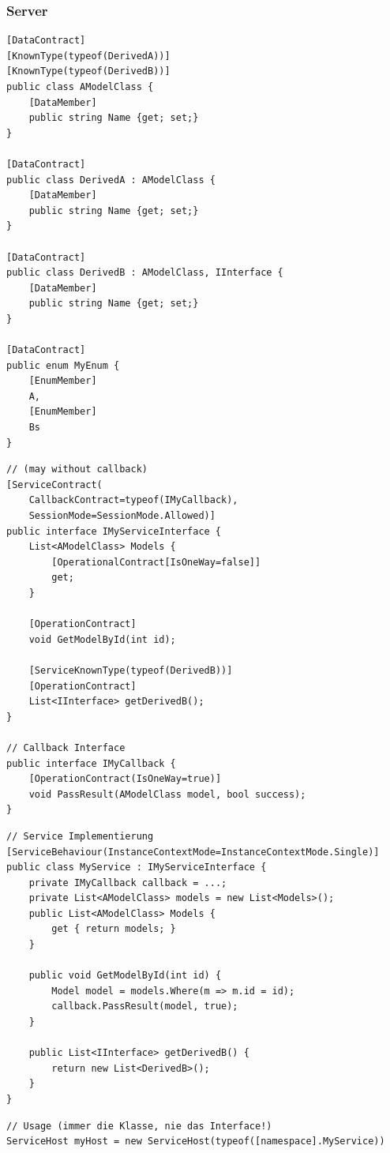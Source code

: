 \documentclass[
a4paper,
oneside,
10pt,
fleqn,
headsepline,
toc=listofnumbered, 
bibliography=totocnumbered]{scrartcl}
\begin{document}
\subsubsection{Server}
\begin{lstlisting}[caption=Data Transfer Objects (DTO)]
[DataContract]
[KnownType(typeof(DerivedA))]
[KnownType(typeof(DerivedB))]
public class AModelClass {
	[DataMember]
	public string Name {get; set;}	
}

[DataContract]
public class DerivedA : AModelClass {
	[DataMember]
	public string Name {get; set;}
}

[DataContract]
public class DerivedB : AModelClass, IInterface {
	[DataMember]
	public string Name {get; set;}
}

[DataContract]
public enum MyEnum {
	[EnumMember]
	A,
	[EnumMember]
	Bs
}
\end{lstlisting}
\begin{lstlisting}[caption=Service Interface]
// (may without callback)
[ServiceContract(
	CallbackContract=typeof(IMyCallback),
	SessionMode=SessionMode.Allowed)]
public interface IMyServiceInterface {
	List<AModelClass> Models {
		[OperationalContract[IsOneWay=false]]
		get;
	}
	
	[OperationContract]
	void GetModelById(int id);
	
	[ServiceKnownType(typeof(DerivedB))]
	[OperationContract]
	List<IInterface> getDerivedB();
}

// Callback Interface
public interface IMyCallback {
	[OperationContract(IsOneWay=true)]
	void PassResult(AModelClass model, bool success);
}

\end{lstlisting}
\begin{lstlisting}[caption=Service Implementation]
// Service Implementierung
[ServiceBehaviour(InstanceContextMode=InstanceContextMode.Single)]
public class MyService : IMyServiceInterface {
	private IMyCallback callback = ...;
	private List<AModelClass> models = new List<Models>();
	public List<AModelClass> Models {
		get { return models; }
	}
	
	public void GetModelById(int id) {
		Model model = models.Where(m => m.id = id);
		callback.PassResult(model, true);
	}
	
	public List<IInterface> getDerivedB() {
		return new List<DerivedB>();
	}
}

\end{lstlisting}
\begin{lstlisting}
// Usage (immer die Klasse, nie das Interface!)
ServiceHost myHost = new ServiceHost(typeof([namespace].MyService))
\end{lstlisting}
\end{document}
